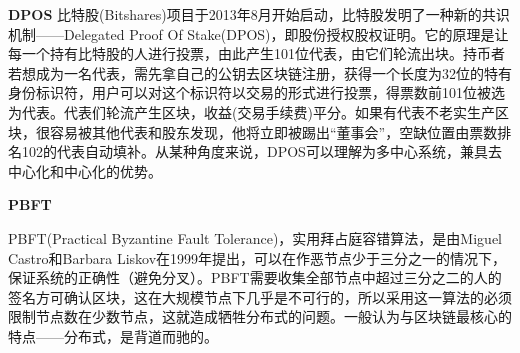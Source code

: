 \documentclass[a4paper,12pt]{article}
\begin{document}






\textbf{DPOS}
比特股(Bitshares)项目于2013年8月开始启动，比特股发明了一种新的共识机制——Delegated Proof Of Stake(DPOS)，即股份授权股权证明。它的原理是让每一个持有比特股的人进行投票，由此产生101位代表，由它们轮流出块。持币者若想成为一名代表，需先拿自己的公钥去区块链注册，获得一个长度为32位的特有身份标识符，用户可以对这个标识符以交易的形式进行投票，得票数前101位被选为代表。代表们轮流产生区块，收益(交易手续费)平分。如果有代表不老实生产区块，很容易被其他代表和股东发现，他将立即被踢出“董事会”，空缺位置由票数排名102的代表自动填补。从某种角度来说，DPOS可以理解为多中心系统，兼具去中心化和中心化的优势。

\textbf{PBFT}

PBFT(Practical Byzantine Fault Tolerance)，实用拜占庭容错算法，是由Miguel Castro和Barbara Liskov在1999年提出，可以在作恶节点少于三分之一的情况下，保证系统的正确性（避免分叉）。PBFT需要收集全部节点中超过三分之二的人的签名方可确认区块，这在大规模节点下几乎是不可行的，所以采用这一算法的必须限制节点数在少数节点，这就造成牺牲分布式的问题。一般认为与区块链最核心的特点——分布式，是背道而驰的。
\end{document}
